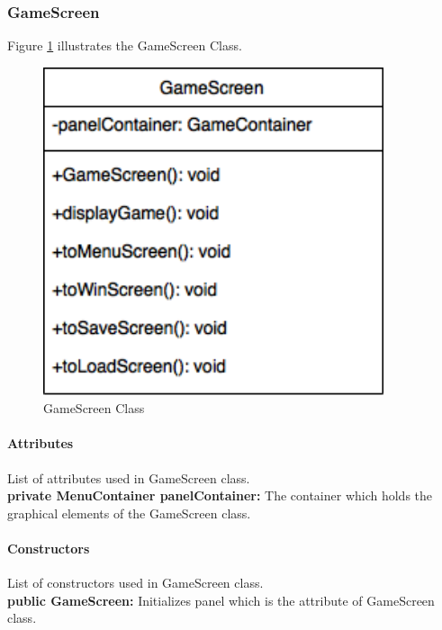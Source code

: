 \documentclass[12pt]{article} %
\begin{document}


\subsubsection{GameScreen} %

Figure \ref{fig:gamescreen} illustrates the GameScreen Class.
\begin{figure}[h!]
   \centering
   \vspace{10pt}%
   \includegraphics[width=10cm]{gamescreen.png}
   \caption{GameScreen Class}
   \label{fig:gamescreen}
\end{figure}

\paragraph{Attributes \\}

List of attributes used in GameScreen class.\\
\textbf{private MenuContainer panelContainer:} The container which holds the graphical elements of the GameScreen class. 

\paragraph{Constructors \\}
List of constructors used in GameScreen class.\\
\textbf{public GameScreen:} Initializes panel which is the attribute of GameScreen class.
\end{document}
